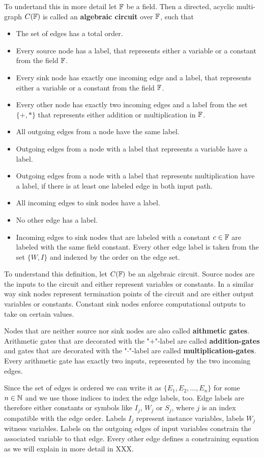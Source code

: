 To undertand this in more detail let $\mathbb{F}$ be a field. Then a directed, acyclic multi-graph $C(\mathbb{F})$ is called an \textbf{algebraic circuit} over $\mathbb{F}$, such that
\begin{itemize}
\item The set of edges has a total order.  
\item Every source node has a label, that represents either a variable or a constant from the field $\mathbb{F}$.
\item Every sink node has exactly one incoming edge and a label, that represents either a variable or a constant from the field $\mathbb{F}$.
\item Every other node has exactly two incoming edges and a label from the set $\{+,*\}$ that represents either addition or multiplication in $\mathbb{F}$.
\item All outgoing edges from a node have the same label.
\item Outgoing edges from a node with a label that represents a variable have a label.
\item Outgoing edges from a node with a label that represents multiplication have a label, if there is at least one labeled edge in both input path.
\item All incoming edges to sink nodes have a label.
\item No other edge has a label.
\item Incoming edges to sink nodes that are labeled with a constant $c\in\mathbb{F}$ are labeled with the same field constant. Every other edge label is taken from the set $\{W,I\}$ and indexed by the order on the edge set. 
\end{itemize} 
To understand this definition, let $C(\mathbb{F})$ be an algebraic circuit. Source nodes are the inputs to the circuit and either represent variables or constants. In a similar way sink nodes represent termination points of the circuit and are either output variables or constants. Constant sink nodes enforce computational outputs to take on certain values.  

Nodes that are neither source nor sink nodes are also called \textbf{aithmetic gates}. Arithmetic gates that are decorated with the "$+$"-label are called \textbf{addition-gates} and gates that are decorated with the "$\cdot$"-label are called \textbf{multiplication-gates}. Every arithmetic gate has exactly two inputs, represented by the two incoming edges.

Since the set of edges is ordered we can write it as $\{E_1,E_2,\ldots, E_n\}$ for some $n\in \mathbb{N}$ and we use those indices to index the edge labels, too. Edge labels are therefore either constants or symbols like $I_j$, $W_j$ or $S_j$, where $j$ is an index compatible with the edge order. Labels $I_j$ represent instance variables, labels $W_j$ witness variables. Labels on the outgoing edges of input variables constrain the associated variable to that edge. Every other edge defines a constraining equation as we will explain in more detail in XXX.

